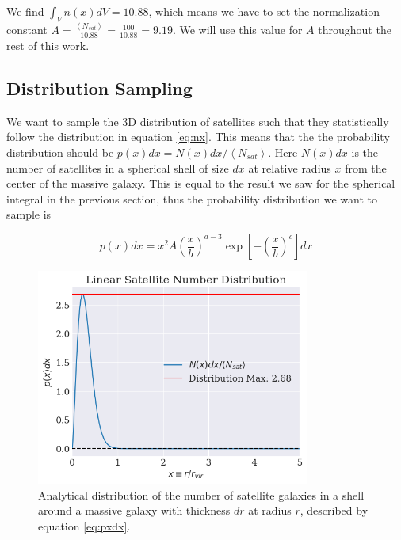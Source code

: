 We find $\int_V n(x)dV = 10.88$, which means we have to set the normalization constant $A = \frac{\left<N_{sat}\right>}{10.88} = \frac{100}{10.88} = 9.19$. We will use this value for $A$ throughout the rest of this work.

%

\subsection{Distribution Sampling}

We want to sample the 3D distribution of satellites such that they statistically follow the distribution in equation \ref{eq:nx}. This means that the the probability distribution should be $p(x)dx = N(x)dx/\left<N_{sat}\right>$. Here $N(x)dx$ is the number of satellites in a spherical shell of size $dx$ at relative radius $x$ from the center of the massive galaxy. This is equal to the result we saw for the spherical integral in the previous section, thus the probability distribution we want to sample is

\begin{equation}
    p(x)dx = x^2 A\left(\frac{x}{b}\right)^{a-3}\exp{\left[-\left(\frac{x}{b}\right)^{c}\right]} dx\label{eq:pxdx}
\end{equation}

\begin{figure}
    \centering
    \includegraphics[width=0.8\textwidth]{results/pxdx.png}
    \caption{Analytical distribution of the number of satellite galaxies in a shell around a massive galaxy with thickness $dr$ at radius $r$, described by equation \ref{eq:pxdx}.}
    \label{fig:pxdx_distribution}
\end{figure}

